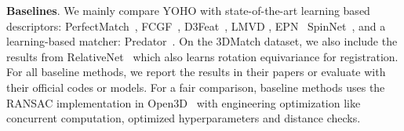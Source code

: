 \textbf{Baselines}. We mainly compare YOHO with state-of-the-art learning based descriptors: PerfectMatch~\cite{smooth}, FCGF~\cite{FCGF},  D3Feat~\cite{d3feat}, LMVD \cite{li2020end}, EPN~\cite{EPN} SpinNet~\cite{ao2020spinnet}, and a learning-based matcher: Predator~\cite{predator}. On the 3DMatch dataset, we also include the results from RelativeNet~\cite{deng20193d} which also learns rotation equivariance for registration.  For all baseline methods, we report the results in their papers or evaluate with their official codes or models.
For a fair comparison, baseline methods uses the RANSAC implementation in Open3D~\cite{zhou2018open3d} with engineering optimization like concurrent computation, optimized hyperparameters and distance checks.


\begin{table}[]
\begin{center}
\end{center}
\end{table}
